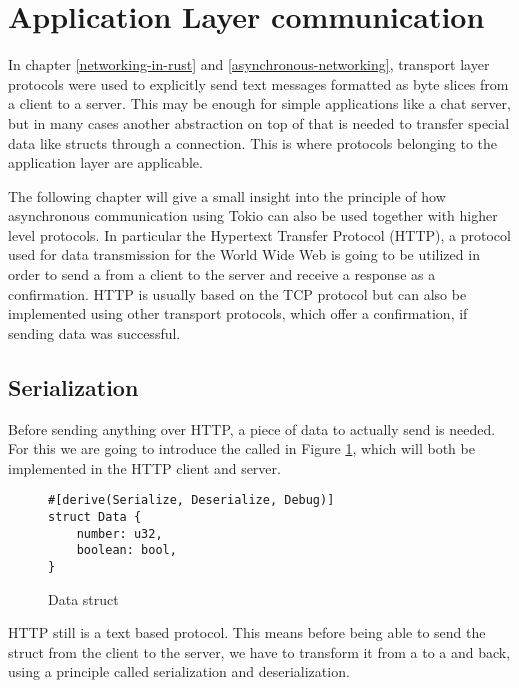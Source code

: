 
\section{Application Layer communication} \label{application-layer-communication}
In chapter \ref{networking-in-rust} and \ref{asynchronous-networking}, transport layer protocols were used to
explicitly send text messages formatted as byte slices from a client to a server. This may be enough for simple
applications like a chat server, but in many cases another abstraction on top of that is needed to transfer special
data like structs through a connection. This is where protocols belonging to the application layer are applicable.

The following chapter will give a small insight into the principle of how asynchronous communication using Tokio can
also be used together with higher level protocols. In particular the Hypertext Transfer Protocol (HTTP), a protocol
used for data transmission for the World Wide Web is going to be utilized in order to send a  from a
client to the server and receive a response as a confirmation. HTTP is usually based on the TCP protocol but can also
be implemented using other transport protocols, which offer a confirmation, if sending data was successful.

\subsection{Serialization}
Before sending anything over HTTP, a piece of data to actually send is needed. For this we are going to introduce the
 called  in Figure \ref{data-struct}, which will both be implemented in the HTTP client and
server.

\begin{figure}[ht]
    \begin{verbatim}
#[derive(Serialize, Deserialize, Debug)]
struct Data {
    number: u32,
    boolean: bool,
}
    \end{verbatim}
    \caption{Data struct}
    \label{data-struct}
\end{figure}

HTTP still is a text based protocol. This means before being able to send the struct from the client to the server, we
have to transform it from a  to a  and back, using a principle called serialization and
deserialization.

